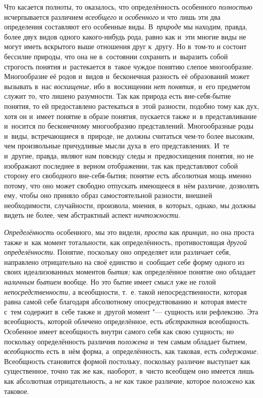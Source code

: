 Что касается полноты, то оказалось, что определённость особенного
{\em полностью} исчерпывается различием {\em всеобщего} и {\em особенного}
и что лишь эти два определения составляют его особенные виды.
В~{\em природе} мы находим,
правда, более двух видов одного какого-нибудь рода, равно как и~эти многие
виды не могут иметь вскрытого выше отношения друг к~другу. Но в~том-то и
состоит бессилие природы, что она не в~состоянии сохранить и~выразить собой
строгость понятия и~растекается в~такое чуждое понятию слепое многообразие.
Многообразие её родов и~видов и~бесконечная разность её образований может
вызывать в~нас {\em восхищение,} ибо в~восхищении {\em нет
понятия,} и~его предметом служит то, что лишено разумности.
Так как природа есть вне-себя-бытие понятия, то ей предоставлено
растекаться в~этой разности, подобно тому как дух, хотя он и~имеет понятие
в образе понятия, пускается также и~в представливание и~носится по
бесконечному многообразию представлений. Многообразные роды и~виды,
встречающиеся в~природе, не должны считаться чем-то более высоким, чем
произвольные причудливые мысли духа в~его представлениях. И~те и~другие,
правда, являют нам повсюду следы и~предвосхищения понятия, но не изображают
последнее в~верном отображении, так как представляют собой сторону его
свободного вне-себя-бытия; понятие есть абсолютная мощь именно потому, что
оно может свободно отпускать имеющееся в~нём различие, дозволять ему, чтобы
оно приняло образ самостоятельной разности, внешней необходимости,
случайности, произвола, мнения, в~которых, однако, мы должны видеть не
более, чем абстрактный аспект {\em ничтожности}.

{\em Определённость} особенного, мы это видели, {\em проста} как {\em принцип,}
но она проста также и~как момент тотальности, как определённость,
противостоящая {\em другой определённости}.
Понятие, поскольку оно определяет или различает себя,
направлено отрицательно на своё единство и~сообщает себе форму одного из
своих идеализованных моментов {\em бытия;} как
определённое понятие оно обладает {\em наличным бытием}
вообще. Но это бытие имеет смысл уже не голой {\em непосредственности,}
а всеобщности, т.~е. такой непосредственности, которая равна
самой себе благодаря абсолютному опосредствованию и~которая вместе с~тем
содержит в~себе также и~другой момент "--- сущность или
рефлексию. Эта всеобщность, которой облечено определённое, есть
{\em абстрактная} всеобщность. Особенное имеет всеобщность внутри самого себя
как свою сущность; но поскольку определённость различия {\em положена} и~тем
самым обладает бытием, {\em всеобщность} есть
в~нём форма, а~определённость, как таковая, есть {\em содержание}.
Всеобщность становится формой постольку, поскольку различие
выступает как существенное, точно так же как, наоборот, в~чисто всеобщем
оно имеется лишь как абсолютная отрицательность, а {\em не как} такое
различие, которое {\em положено} как таковое.

